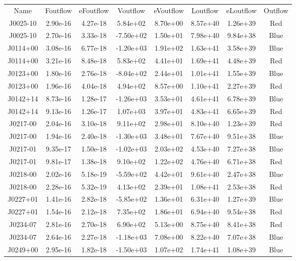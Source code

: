 \begin{table}
\begin{tabular}{cccccccc}
Name & Foutflow & eFoutflow & Voutflow & eVoutflow & Loutflow & eLoutflow & Outflow \\
J0025-10 & 2.90e-16 & 4.27e-18 & 5.84e+02 & 8.70e+00 & 8.57e+40 & 1.26e+39 & Red \\
J0025-10 & 2.70e-16 & 3.33e-18 & -7.50e+02 & 1.50e+01 & 7.98e+40 & 9.84e+38 & Blue \\
J0114+00 & 3.08e-16 & 6.77e-18 & -1.20e+03 & 1.91e+02 & 1.63e+41 & 3.58e+39 & Blue \\
J0114+00 & 3.21e-16 & 8.48e-18 & 5.83e+02 & 4.41e+01 & 1.69e+41 & 4.48e+39 & Red \\
J0123+00 & 1.80e-16 & 2.76e-18 & -8.04e+02 & 2.44e+01 & 1.01e+41 & 1.55e+39 & Blue \\
J0123+00 & 1.96e-16 & 4.04e-18 & 4.94e+02 & 8.57e+00 & 1.10e+41 & 2.27e+39 & Red \\
J0142+14 & 8.73e-16 & 1.28e-17 & -1.26e+03 & 3.53e+01 & 4.61e+41 & 6.78e+39 & Blue \\
J0142+14 & 9.13e-16 & 1.26e-17 & 1.07e+03 & 3.97e+01 & 4.83e+41 & 6.65e+39 & Red \\
J0217-00 & 2.04e-16 & 3.10e-18 & 9.11e+02 & 2.98e+01 & 8.10e+40 & 1.23e+39 & Red \\
J0217-00 & 1.94e-16 & 2.40e-18 & -1.30e+03 & 3.48e+01 & 7.67e+40 & 9.51e+38 & Blue \\
J0217-01 & 9.35e-17 & 1.50e-18 & -1.02e+03 & 2.03e+02 & 4.53e+40 & 7.27e+38 & Blue \\
J0217-01 & 9.81e-17 & 1.38e-18 & 9.10e+02 & 1.22e+02 & 4.76e+40 & 6.71e+38 & Red \\
J0218-00 & 2.02e-16 & 5.18e-19 & -5.59e+02 & 4.42e+01 & 9.61e+40 & 2.47e+38 & Blue \\
J0218-00 & 2.28e-16 & 5.32e-19 & 4.13e+02 & 2.39e+01 & 1.08e+41 & 2.53e+38 & Red \\
J0227+01 & 1.41e-16 & 2.82e-18 & -5.85e+02 & 1.36e+01 & 6.31e+40 & 1.27e+39 & Blue \\
J0227+01 & 1.54e-16 & 2.12e-18 & 7.35e+02 & 1.86e+01 & 6.94e+40 & 9.54e+38 & Red \\
J0234-07 & 2.81e-16 & 2.70e-18 & 6.90e+02 & 5.13e+00 & 8.75e+40 & 8.41e+38 & Red \\
J0234-07 & 2.64e-16 & 2.27e-18 & -1.18e+03 & 7.08e+00 & 8.22e+40 & 7.07e+38 & Blue \\
J0249+00 & 2.95e-16 & 1.82e-18 & -1.50e+03 & 1.07e+02 & 1.74e+41 & 1.08e+39 & Blue \\

\end{tabular}
\end{table}
